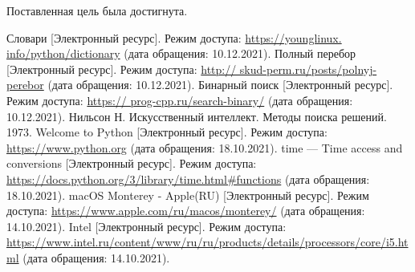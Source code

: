 \documentclass[a4paper,14pt, unknownkeysallowed]{extreport}
\begin{document}
Поставленная цель была достигнута.





\begin{thebibliography}{5}
	Словари [Электронный ресурс]. Режим доступа: \url{https://younglinux. info/python/dictionary} (дата обращения: 10.12.2021).
	Полный перебор [Электронный ресурс]. Режим доступа: \url{http:// skud-perm.ru/posts/polnyj-perebor} (дата обращения: 10.12.2021).
	Бинарный поиск [Электронный ресурс]. Режим доступа: \url{https:// prog-cpp.ru/search-binary/} (дата обращения: 10.12.2021).
	Нильсон Н. Искусственный интеллект. Методы поиска решений. 1973.
	Welcome to Python [Электронный ресурс]. Режим доступа: \url{https://www.python.org} (дата обращения: 18.10.2021).
	time — Time access and conversions [Электронный ресурс]. Режим доступа: \url{https://docs.python.org/3/library/time.html#functions} (дата обращения: 18.10.2021).
	macOS Monterey - Apple(RU) [Электронный ресурс]. Режим доступа: \url{https://www.apple.com/ru/macos/monterey/} (дата обращения: 14.10.2021).
	Intel [Электронный ресурс]. Режим доступа: \url{https://www.intel.ru/content/www/ru/ru/products/details/processors/core/i5.html} (дата обращения: 14.10.2021).
\end{thebibliography}

\end{document}
